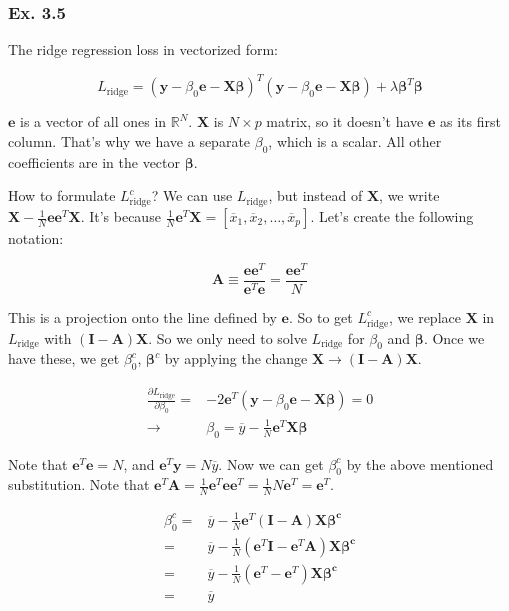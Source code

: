\documentclass{article}
\begin{document}
\subsubsection{Ex. 3.5}

The ridge regression loss in vectorized form:

\[
L_{\text{ridge}} = (\mathbf{y} - \beta_0 \mathbf{e} - \mathbf{X}\bm{\beta})^T (\mathbf{y} - \beta_0 \mathbf{e} - \mathbf{X}\bm{\beta}) + \lambda \bm{\beta}^T\bm{\beta}
\]

$\mathbf{e}$ is a vector of all ones in $\mathbb{R}^N$. $\mathbf{X}$ is $N\times p$ matrix, so it doesn't have $\mathbf{e}$ as its first column. That's why we have a separate $\beta_0$, which is a scalar. All other coefficients are in the vector $\bm{\beta}$.

How to formulate $L^c_{\text{ridge}}$? We can use $L_{\text{ridge}}$, but instead of $\mathbf{X}$, we write $\mathbf{X} - \frac{1}{N}\mathbf{e}\mathbf{e}^T\mathbf{X}$. It's because $\frac{1}{N}\mathbf{e}^T\mathbf{X} = [\overline{x}_1, \overline{x}_2, \dots, \overline{x}_p]$. Let's create the following notation:

\[
    \mathbf{A} \equiv \frac{\mathbf{e}\mathbf{e}^T}{\mathbf{e}^T\mathbf{e}} = \frac{\mathbf{e}\mathbf{e}^T}{N}
\]

This is a projection onto the line defined by $\mathbf{e}$. So to get $L^c_{\text{ridge}}$, we replace $\mathbf{X}$ in $L_{\text{ridge}}$ with $(\mathbf{I} - \mathbf{A})\mathbf{X}$. So we only need to solve $L_{\text{ridge}}$ for $\beta_0$ and $\bm{\beta}$. Once we have these, we get $\beta^c_0$, $\bm{\beta}^c$ by applying the change $\mathbf{X} \to (\mathbf{I} - \mathbf{A})\mathbf{X}$.

\[
\begin{split}
\frac{\partial L_{\text{ridge}}}{\partial \beta_0} =& -2\mathbf{e}^T(\mathbf{y} - \beta_0 \mathbf{e} - \mathbf{X}\bm{\beta}) = 0\\
\to & \beta_0 = \overline{y} - \frac{1}{N}\mathbf{e}^T \mathbf{X} \bm{\beta}
\end{split}
\]

Note that $\mathbf{e}^T\mathbf{e} = N$, and $\mathbf{e}^T \mathbf{y} = N \overline{y}$. Now we can get $\beta^c_0$ by the above mentioned substitution. Note that $\mathbf{e}^T\mathbf{A} = \frac1N \mathbf{e}^T\mathbf{e}\mathbf{e}^T = \frac1N N\mathbf{e}^T = \mathbf{e}^T$.

\[
\begin{split}
\beta^c_0 =& \overline{y} - \frac1N \mathbf{e}^T (\mathbf{I} - \mathbf{A})\mathbf{X}\bm{\beta^c}\\
=& \overline{y} - \frac1N (\mathbf{e}^T\mathbf{I} - \mathbf{e}^T\mathbf{A})\mathbf{X}\bm{\beta^c}\\
=& \overline{y} - \frac1N (\mathbf{e}^T - \mathbf{e}^T)\mathbf{X}\bm{\beta^c}\\
=& \overline{y}
\end{split}
\]
\end{document}
